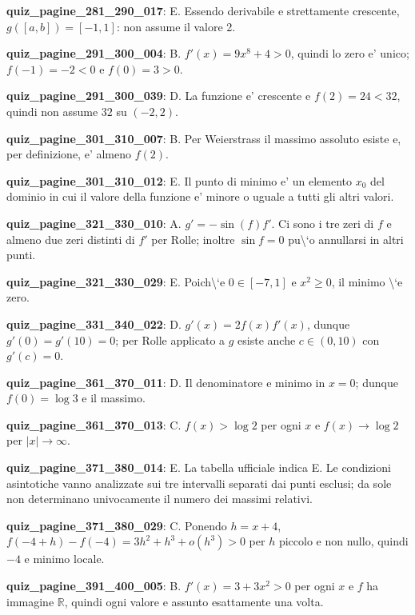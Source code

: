 \documentclass[11pt,a4paper]{article}
\newcounter{quiz}
\begin{document}
\noindent\textbf{quiz\_pagine\_281\_290\_017}: E. Essendo derivabile e strettamente crescente, $g([a,b])=[-1,1]$: non assume il valore 2.\par\medskip
\noindent\textbf{quiz\_pagine\_291\_300\_004}: B. $f'(x)=9x^8+4>0$, quindi lo zero e' unico; $f(-1)=-2<0$ e $f(0)=3>0$.\par\medskip
\noindent\textbf{quiz\_pagine\_291\_300\_039}: D. La funzione e' crescente e $f(2)=24<32$, quindi non assume $32$ su $(-2,2)$.\par\medskip
\noindent\textbf{quiz\_pagine\_301\_310\_007}: B. Per Weierstrass il massimo assoluto esiste e, per definizione, e' almeno $f(2)$.\par\medskip
\noindent\textbf{quiz\_pagine\_301\_310\_012}: E. Il punto di minimo e' un elemento $x_0$ del dominio in cui il valore della funzione e' minore o uguale a tutti gli altri valori.\par\medskip
\noindent\textbf{quiz\_pagine\_321\_330\_010}: A. $g\prime=-\sin(f)f\prime$. Ci sono i tre zeri di $f$ e almeno due zeri distinti di $f\prime$ per Rolle; inoltre $\sin f=0$ pu\textbackslash{}`o annullarsi in altri punti.\par\medskip
\noindent\textbf{quiz\_pagine\_321\_330\_029}: E. Poich\textbackslash{}`e $0\in[-7,1]$ e $x^2\geq0$, il minimo \textbackslash{}`e zero.\par\medskip
\noindent\textbf{quiz\_pagine\_331\_340\_022}: D. $g\prime(x)=2f(x)f\prime(x)$, dunque $g\prime(0)=g\prime(10)=0$; per Rolle applicato a $g$ esiste anche $c\in(0,10)$ con $g\prime(c)=0$.\par\medskip
\noindent\textbf{quiz\_pagine\_361\_370\_011}: D. Il denominatore e minimo in $x=0$; dunque $f(0)=\log3$ e il massimo.\par\medskip
\noindent\textbf{quiz\_pagine\_361\_370\_013}: C. $f(x)>\log2$ per ogni $x$ e $f(x)\to\log2$ per $|x|\to\infty$.\par\medskip
\noindent\textbf{quiz\_pagine\_371\_380\_014}: E. La tabella ufficiale indica E. Le condizioni asintotiche vanno analizzate sui tre intervalli separati dai punti esclusi; da sole non determinano univocamente il numero dei massimi relativi.\par\medskip
\noindent\textbf{quiz\_pagine\_371\_380\_029}: C. Ponendo $h=x+4$, $f(-4+h)-f(-4)=3h^2+h^3+o(h^3)>0$ per $h$ piccolo e non nullo, quindi $-4$ e minimo locale.\par\medskip
\noindent\textbf{quiz\_pagine\_391\_400\_005}: B. $f\prime(x)=3+3x^2>0$ per ogni $x$ e $f$ ha immagine $\mathbb R$, quindi ogni valore e assunto esattamente una volta.\par\medskip
\end{document}
